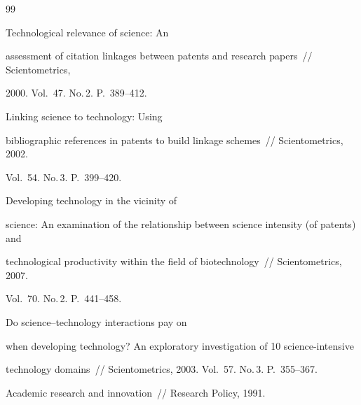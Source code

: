   {\small\frenchspacing


{%




\begin{thebibliography}{99}





     




 Technological relevance of science: An 


assessment of citation linkages between patents and research papers~/\!\!/ Scientometrics, 


2000. Vol.~47. No.\,2. P.~389--412.







 Linking science to technology: Using 


bibliographic references in patents to build linkage schemes~/\!\!/ Scientometrics, 2002. 


Vol.~54. No.\,3. P.~399--420.







 Developing technology in the vicinity of 


science: An examination of the relationship between science intensity (of patents) and 


technological productivity within the field of biotechnology~/\!\!/ Scientometrics, 2007. 


Vol.~70. No.\,2. P.~441--458.







 Do science--technology interactions pay on 


when developing technology? An exploratory investigation of 10 science-intensive 


technology domains~/\!\!/ Scientometrics, 2003. Vol.~57. No.\,3. P.~355--367. 




 Academic research and innovation~/\!\!/ Research Policy, 1991. 



\end{thebibliography}}}
